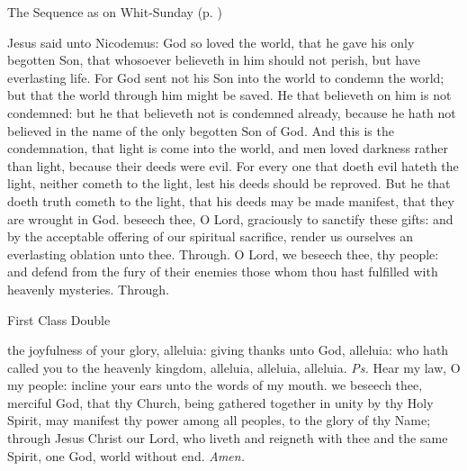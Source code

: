 \begin{rubric}
{The Sequence as on Whit-Sunday (p. \pageref{WhitSeq})}
\end{rubric}
 Jesus said unto Nicodemus: God so loved the world, that he gave his only begotten Son, that whosoever believeth in him should not perish, but have everlasting life. For God sent not his Son into the world to condemn the world; but that the world through him might be saved. He that believeth on him is not condemned: but he that believeth not is condemned already, because he hath not believed in the name of the only begotten Son of God. And this is the condemnation, that light is come into the world, and men loved darkness rather than light, because their deeds were evil. For every one that doeth evil hateth the light, neither cometh to the light, lest his deeds should be reproved. But he that doeth truth cometh to the light, that his deeds may be made manifest, that they are wrought in God.
\secret
{} beseech thee, O Lord, graciously to sanctify these gifts: and by the acceptable offering of our spiritual sacrifice, render us ourselves an everlasting oblation unto thee. Through.
\postcommunion
{} O Lord, we beseech thee, thy people: and defend from the fury of their enemies those whom thou hast fulfilled with heavenly mysteries. Through.

\begin{inhead}
    {First Class Double}
\end{inhead}

\properantiphonfix

\introit
{} the joyfulness of your glory, alleluia: giving thanks unto God, alleluia: who hath called you to the heavenly kingdom, alleluia, alleluia, alleluia. \textit{Ps.} Hear my law, O my people: incline your ears unto the words of my mouth.
\collect
{} we beseech thee, merciful God, that thy Church, being gathered together in unity by thy Holy Spirit, may manifest thy power among all peoples, to the glory of thy Name; through Jesus Christ our Lord, who liveth and reigneth with thee and the same Spirit, one God, world without end. \textit{Amen.}

